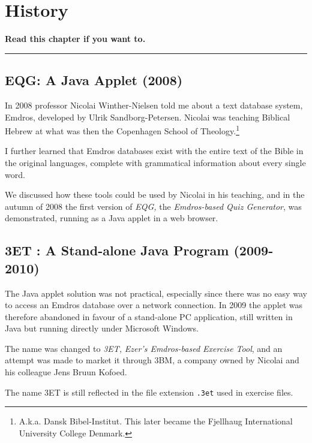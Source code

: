 \documentclass[11pt,oneside,a4paper]{memoir}
\newcommand*{\indexw}[1]{%
  #1%
  \index{#1}%
}
\begin{document}
\chapter{History}

\textbf{Read this chapter if you want to.}
\plainbreak{3}


\section{EQG: A Java Applet (2008)}

In 2008 professor Nicolai Winther-Nielsen told me about a text database system, Emdros, developed by
Ulrik Sandborg-Petersen. Nicolai was teaching Biblical Hebrew at what was then the Copenhagen School
of Theology.\footnote{A.k.a. Dansk Bibel-Institut. This later became the Fjellhaug International
  University College Denmark.}

I further learned that Emdros databases exist with the entire text of the Bible in the original
languages, complete with grammatical information about every single word.

We discussed how these tools could be used by Nicolai in his teaching, and in the autumn of 2008 the
first version of \emph{EQG,} the \emph{Emdros-based Quiz Generator}, was demonstrated, running as a Java
applet in a web browser.

\section{\indexw{3ET}: A Stand-alone Java Program (2009-2010)}

The Java applet solution was not practical, especially since there was no easy way to access an
Emdros database over a network connection. In 2009 the applet was therefore abandoned in favour of a
stand-alone PC application, still written in Java but running directly under Microsoft Windows.

The name was changed to \emph{3ET,} \emph{Ezer's Emdros-based Exercise Tool}, and an attempt was made to
market it through 3BM, a company owned by Nicolai and his colleague Jens Bruun Kofoed.

The name 3ET is still reflected in the file extension \texttt{.3et} used in exercise files.
\end{document}

